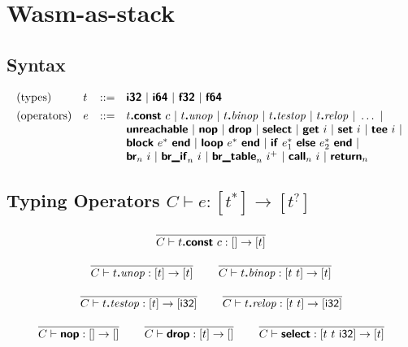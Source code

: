 \documentclass[a4paper]{scrartcl}
\newcommand\x[1]{\ensuremath{\mathit{#1}}\xspace}
\newcommand\K[1]{\ensuremath{\textsf{#1}}}
\newcommand\KK[1]{\ensuremath{\K{\textbf{#1}}}}
\begin{document}

\section{Wasm-as-stack}


\subsection*{Syntax}

$$
\begin{array}{@{}llcl@{}}
\text{(types)} & t &::=&
  \KK{i32} ~|~
  \KK{i64} ~|~
  \KK{f32} ~|~
  \KK{f64} \\
[1ex]
\text{(operators)} & e &::=&
  t\KK{.const}~c ~|~
  t\KK{.}\x{unop} ~|~
  t\KK{.}\x{binop} ~|~
  t\KK{.}\x{testop} ~|~
  t\KK{.}\x{relop} ~|~
  \dots ~|~ \\&&&
  \KK{unreachable} ~|~
  \KK{nop} ~|~
  \KK{drop} ~|~
  \KK{select} ~|~
  \KK{get}~i ~|~
  \KK{set}~i ~|~
  \KK{tee}~i ~|~ \\&&&
  \KK{block}~e^\ast~\KK{end} ~|~
  \KK{loop}~e^\ast~\KK{end} ~|~
  \KK{if}~e_1^\ast~\KK{else}~e_2^\ast~\KK{end} ~|~ \\&&&
  \KK{br}_n~i ~|~
  \KK{br\_if}_n~i ~|~
  \KK{br\_table}_n~i^+ ~|~
  \KK{call}_n~i ~|~
  \KK{return}_n \\
\end{array}
$$


\newcommand\orbot{}
\newcommand\poly[1]{[#1]}
\newcommand\botrule[1]{}


\subsection*{Typing Operators \hfill $\boxed{C \vdash e : [t^\ast] \to [t^?]\orbot}$}

$$
\frac{
}{
  C \vdash t\KK{.const}~c : [] \to [t]
}
$$

$$
\frac{
}{
  C \vdash t\KK{.}\x{unop} : [t] \to [t]
}
\qquad
\frac{
}{
  C \vdash t\KK{.}\x{binop} : [t~t] \to [t]
}
$$

$$
\frac{
}{
  C \vdash t\KK{.}\x{testop} : [t] \to [\K{i32}]
}
\qquad
\frac{
}{
  C \vdash t\KK{.}\x{relop} : [t~t] \to [\K{i32}]
}
$$

$$
\frac{
}{
  C \vdash \KK{nop} : [] \to []
}
\qquad
\frac{
}{
  C \vdash \KK{drop} : [t] \to []
}
\qquad
\frac{
}{
  C \vdash \KK{select} : [t~t~\K{i32}] \to [t]
}
$$
\end{document}
